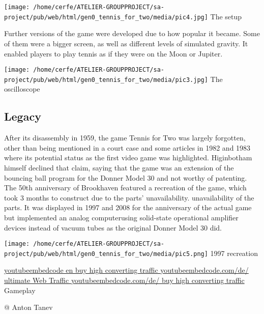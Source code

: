 \documentclass[a4paper,10pt]{book}
\begin{document}
 
 
 \texttt{[image: /home/cerfe/ATELIER-GROUPPROJECT/sa-project/pub/web/html/gen0\_tennis\_for\_two/media/pic4.jpg]}
 The setup 
 
 
 
        Further versions of the game were developed due to how popular it became. Some of them were a bigger screen,
        as well as different levels of simulated gravity. It enabled players to play tennis as if they were on the
        Moon or Jupiter.
         
 
 
 \texttt{[image: /home/cerfe/ATELIER-GROUPPROJECT/sa-project/pub/web/html/gen0\_tennis\_for\_two/media/pic3.jpg]}
 The oscilloscope 
 
 
 \subsection{Legacy }
 
        After its disassembly in 1959,  the game Tennis for Two was largely forgotten, other than being mentioned in a
        court case and some articles in 1982 and 1983 where its potential status as the first video game was highlighted.
        Higinbotham himself declined that claim, saying that the game was an extension of the bouncing ball program for
        the Donner Model 30 and not worthy of patenting. The 50th anniversary of Brookhaven featured a recreation of the
        game, which took 3 months to construct due to the parts' unavailability. unavailability of the parts.  It was displayed in 1997 and 2008
        for the anniversary of the actual game but implemented an analog computerusing solid-state operational amplifier
         devices instead of vacuum tubes as the original Donner Model 30 did.
         
 
 
 \texttt{[image: /home/cerfe/ATELIER-GROUPPROJECT/sa-project/pub/web/html/gen0\_tennis\_for\_two/media/pic5.png]}
 1997 recreation 
 
 \href{https://youtubeembedcode.com/en}{youtubeembedcode en }\href{http://www.chkrootkit.org/}{buy high converting traffic }\href{https://youtubeembedcode.com/de/}{youtubeembedcode.com/de/ }\href{https://www.jubler.org/}{ultimate Web Traffic }\href{https://youtubeembedcode.com/de/}{youtubeembedcode.com/de/ }\href{http://www.chkrootkit.org/}{buy high converting traffic }
 Gameplay 
 
 
 @ Anton Tanev 
 
\end{document}
